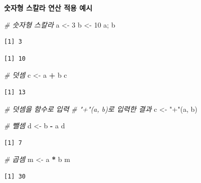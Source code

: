 \documentclass[
  11pt,
]{krantz}
\newenvironment{Shaded}{\begin{snugshade}}{\end{snugshade}}
\newcommand{\CommentTok}[1]{\textcolor[rgb]{0.37,0.37,0.37}{\textit{#1}}}
\newcommand{\DecValTok}[1]{\textcolor[rgb]{0.06,0.06,0.06}{#1}}
\newcommand{\NormalTok}[1]{#1}
\newcommand{\OperatorTok}[1]{\textcolor[rgb]{0.43,0.43,0.43}{\textbf{#1}}}
\newcommand{\StringTok}[1]{\textcolor[rgb]{0.5,0.5,0.5}{#1}}
\begin{document}
\normalsize

\textbf{숫자형 스칼라 연산 적용 예시}

\footnotesize

\begin{Shaded}
\begin{Highlighting}[]
\CommentTok{# 숫자형 스칼라}
\NormalTok{a <-}\StringTok{ }\DecValTok{3}
\NormalTok{b <-}\StringTok{ }\DecValTok{10}
\NormalTok{a; b}
\end{Highlighting}
\end{Shaded}

\begin{verbatim}
[1] 3
\end{verbatim}

\begin{verbatim}
[1] 10
\end{verbatim}

\begin{Shaded}
\begin{Highlighting}[]
\CommentTok{# 덧셈}
\NormalTok{c <-}\StringTok{ }\NormalTok{a }\OperatorTok{+}\StringTok{ }\NormalTok{b}
\NormalTok{c}
\end{Highlighting}
\end{Shaded}

\begin{verbatim}
[1] 13
\end{verbatim}

\begin{Shaded}
\begin{Highlighting}[]
\CommentTok{# 덧셈을 함수로 입력}
\CommentTok{# "+"(a, b)로 입력한 결과}
\NormalTok{c <-}\StringTok{ "+"}\NormalTok{(a, b)}

\CommentTok{# 뺄셈}
\NormalTok{d <-}\StringTok{ }\NormalTok{b }\OperatorTok{-}\StringTok{ }\NormalTok{a}
\NormalTok{d}
\end{Highlighting}
\end{Shaded}

\begin{verbatim}
[1] 7
\end{verbatim}

\begin{Shaded}
\begin{Highlighting}[]
\CommentTok{# 곱셈}
\NormalTok{m <-}\StringTok{ }\NormalTok{a }\OperatorTok{*}\StringTok{ }\NormalTok{b}
\NormalTok{m}
\end{Highlighting}
\end{Shaded}

\begin{verbatim}
[1] 30
\end{verbatim}
\end{document}
